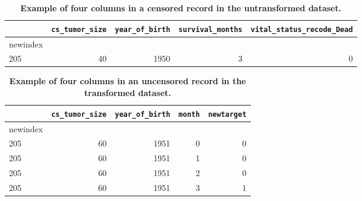 \documentclass[10pt,letterpaper]{article}
\newcommand{\codewhite}[1]{\colorbox{white}{\texttt{#1}}}
\begin{document}
\begin{table}[H]
\begin{adjustwidth}{-2.25in}{0in} %
\caption{\label{tab:originalalive} {\bf Example of four columns in a censored record in the untransformed dataset.}}
\begin{tabular}{lrrrr}
\toprule
{} &  \codewhite{cs\_tumor\_size} &  \codewhite{year\_of\_birth} &  \codewhite{survival\_months} &  \codewhite{vital\_status\_recode\_Dead} \\
\midrule
newindex &                &                &        &            \\
205      &             40 &           1950 &      3 &          0 \\
\bottomrule
\end{tabular}
\end{adjustwidth}
\end{table}


\begin{table}[H]
\begin{adjustwidth}{-2.25in}{0in} %
\caption{\label{tab:transformeddead} {\bf Example of four columns in an uncensored record in the transformed dataset.}}
\begin{tabular}{lrrrr}
\toprule
{} &  \codewhite{cs\_tumor\_size} &  \codewhite{year\_of\_birth} &  \codewhite{month} &  \codewhite{newtarget} \\
\midrule
newindex &                &                &        &            \\
205      &             60 &           1951 &      0 &          0 \\
205      &             60 &           1951 &      1 &          0 \\
205      &             60 &           1951 &      2 &          0 \\
205      &             60 &           1951 &      3 &          1 \\
\bottomrule
\end{tabular}
\end{adjustwidth}
\end{table}
\end{document}
